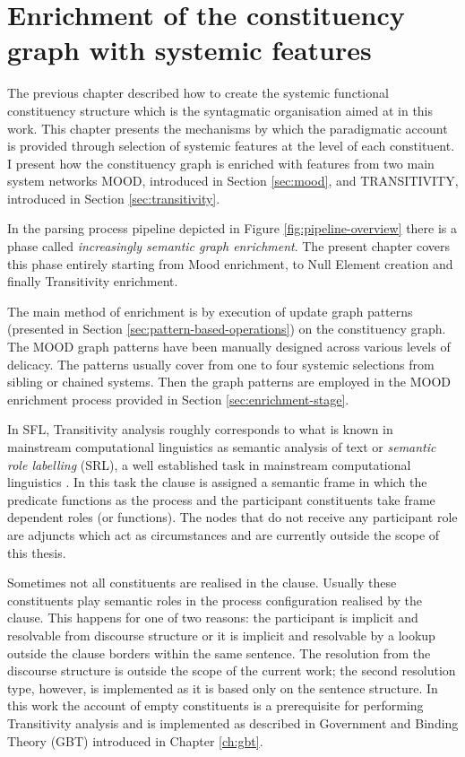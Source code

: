 \chapter{Enrichment of the constituency graph with systemic features}
\label{ch:enrichment-stage}

    The previous chapter described how to create the systemic functional constituency structure which is the syntagmatic organisation aimed at in this work. This chapter presents the mechanisms by which the paradigmatic account is provided through selection of systemic features at the level of each constituent. I present how the constituency graph is enriched with features from two main system networks MOOD, introduced in Section \ref{sec:mood}, and TRANSITIVITY, introduced in Section \ref{sec:transitivity}.

    In the parsing process pipeline depicted in Figure \ref{fig:pipeline-overview} there is a phase called \textit{increasingly semantic graph enrichment}. The present chapter covers this phase entirely starting from Mood enrichment, to Null Element creation and finally Transitivity enrichment.

    The main method of enrichment is by execution of update graph patterns (presented in Section \ref{sec:pattern-based-operations}) on the constituency graph. The MOOD graph patterns have been manually designed across various levels of delicacy. The patterns usually cover from one to four systemic selections from sibling or chained systems. Then the graph patterns are employed in the MOOD enrichment process provided  in Section \ref{sec:enrichment-stage}. 

    In SFL, Transitivity analysis roughly corresponds to what is known in mainstream computational linguistics as semantic analysis of text or \textit{semantic role labelling} (SRL), a well established task in mainstream computational linguistics \citep{Carreras2005, Pradhan2007}. In this task the clause is assigned a semantic frame in which the predicate functions as the process and the participant constituents take frame dependent roles (or functions). The nodes that do not receive any participant role are adjuncts which act as circumstances and are currently outside the scope of this thesis.

    Sometimes not all constituents are realised in the clause. Usually these constituents play semantic roles in the process configuration realised by the clause. This happens for one of two reasons: the participant is implicit and resolvable from discourse structure or it is implicit and resolvable by a lookup outside the clause borders within the same sentence. The resolution from the discourse structure is outside the scope of the current work; the second resolution type, however, is implemented as it is based only on the sentence structure. In this work the account of empty constituents is a prerequisite for performing Transitivity analysis and is implemented as described in Government and Binding Theory (GBT) \citep{Haegeman1991} introduced in Chapter \ref{ch:gbt}.


